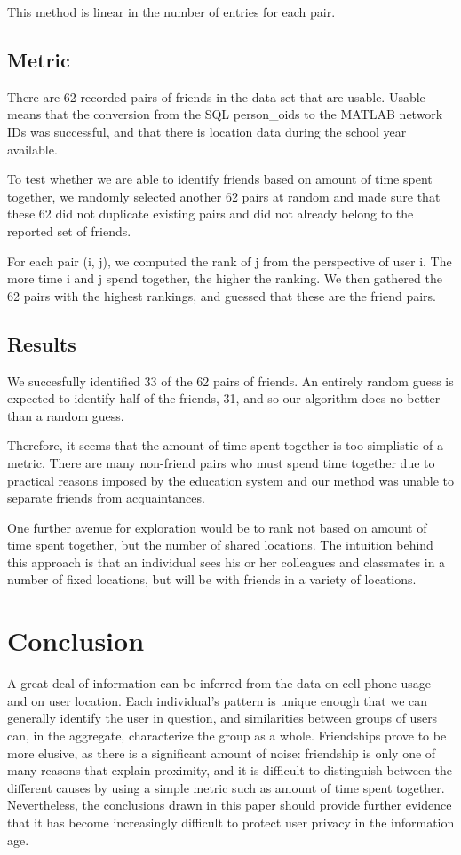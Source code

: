 \documentclass[pageno]{jpaper}
\begin{document}
This method is linear in the number of entries for each pair. 

\subsection{Metric}

There are 62 recorded pairs of friends in the data set that are usable. Usable means that the conversion from the SQL person\_oids to the MATLAB network IDs was successful, and that there is location data during the school year available. 

To test whether we are able to identify friends based on amount of time spent together, we randomly selected another 62 pairs at random and made sure that these 62 did not duplicate existing pairs and did not already belong to the reported set of friends. 

For each pair (i, j), we computed the rank of j from the perspective of user i. The more time i and j spend together, the higher the ranking. We then gathered the 62 pairs with the highest rankings, and guessed that these are the friend pairs.

\subsection{Results}

We succesfully identified 33 of the 62 pairs of friends. An entirely random guess is expected to identify half of the friends, 31, and so our algorithm does no better than a random guess. 

Therefore, it seems that the amount of time spent together is too simplistic of a metric. There are many non-friend pairs who must spend time together due to practical reasons imposed by the education system and our method was unable to separate friends from acquaintances.

One further avenue for exploration would be to rank not based on amount of time spent together, but the number of shared locations. The intuition behind this approach is that an individual sees his or her colleagues and classmates in a number of fixed locations, but will be with friends in a variety of locations. 

\section{Conclusion}

A great deal of information can be inferred from the data on cell phone usage and on user location. Each individual's pattern is unique enough that we can generally identify the user in question, and similarities between groups of users can, in the aggregate, characterize the group as a whole. Friendships prove to be more elusive, as there is a significant amount of noise: friendship is only one of many reasons that explain proximity, and it is difficult to distinguish between the different causes by using a simple metric such as amount of time spent together. Nevertheless, the conclusions drawn in this paper should provide further evidence that it has become increasingly difficult to protect user privacy in the information age. 
\end{document}
